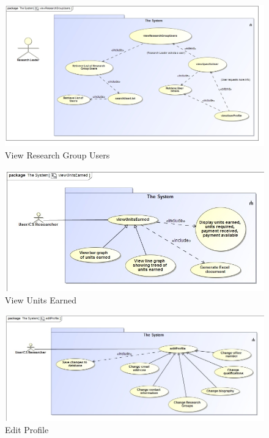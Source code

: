 \documentclass[a4paper,12pt]{article}
\begin{document}
\begin{figure}[H]
    \centering
    \caption{View Research Group Users}
    \includegraphics[width=1\textwidth]{req-func/uc__The_System__viewResearchGroupUsers.jpg}
\end{figure}

\begin{figure}[H]
    \centering
    \caption{View Units Earned}
    \includegraphics[width=1\textwidth]{req-func/uc__The_System__viewUnitsEarned.jpg}
\end{figure}

\begin{figure}[H]
    \centering
    \caption{Edit Profile}
    \includegraphics[width=1\textwidth]{req-func/uc__The_System__editProfile.jpg}
\end{figure}
\end{document}
